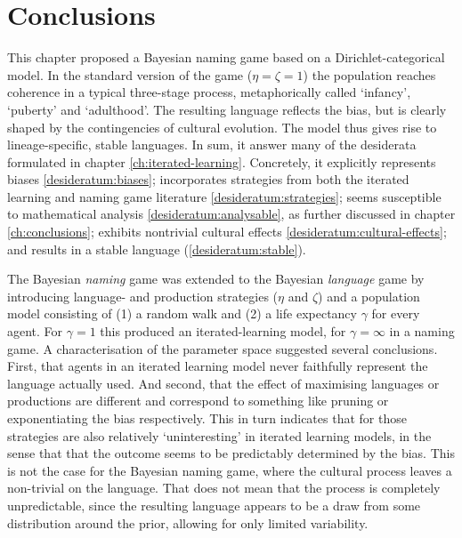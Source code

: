 \documentclass{../src/bcthesispart}
\begin{document}
\section{Conclusions}


This chapter proposed a Bayesian naming game based on a Dirichlet-categorical model.
In the standard version of the game ($\eta=\zeta=1$) the population reaches coherence in a typical three-stage process, metaphorically called ‘infancy’, ‘puberty’ and ‘adulthood’.
The resulting language reflects the bias, but is clearly shaped by the contingencies of cultural evolution.
The model thus gives rise to lineage-specific, stable languages.
In sum, it answer many of the desiderata formulated in chapter \ref{ch:iterated-learning}. 
Concretely, it explicitly represents biases \ref{desideratum:biases};
incorporates strategies from both the iterated learning and naming game literature \ref{desideratum:strategies};
seems susceptible to mathematical analysis \ref{desideratum:analysable}, as further discussed in chapter \ref{ch:conclusions};
exhibits nontrivial cultural effects \ref{desideratum:cultural-effects}; 
and results in a stable language (\ref{desideratum:stable}).



The Bayesian \emph{naming} game was extended to the Bayesian \emph{language} game by introducing language- and production strategies ($\eta$ and $\zeta$) and a population model consisting of (1) a random walk and (2) a life expectancy $\gamma$ for every agent.
For $\gamma=1$ this produced an iterated-learning model, for $\gamma=\infty$ in a naming game.
A characterisation of the parameter space suggested several conclusions.
First, that agents in an iterated learning model never faithfully represent the language actually used.
And second, that the effect of maximising languages or productions are different and correspond to something like pruning or exponentiating the bias respectively.
This in turn indicates that for those strategies are also relatively ‘uninteresting’ in iterated learning models, in the sense that that the outcome seems to be predictably determined by the bias.
This is not the case for the Bayesian naming game, where the cultural process leaves a non-trivial on the language.
That does not mean that the process is completely unpredictable, since the resulting language appears to be a draw from some distribution around the prior, allowing for only limited variability.
\end{document}

